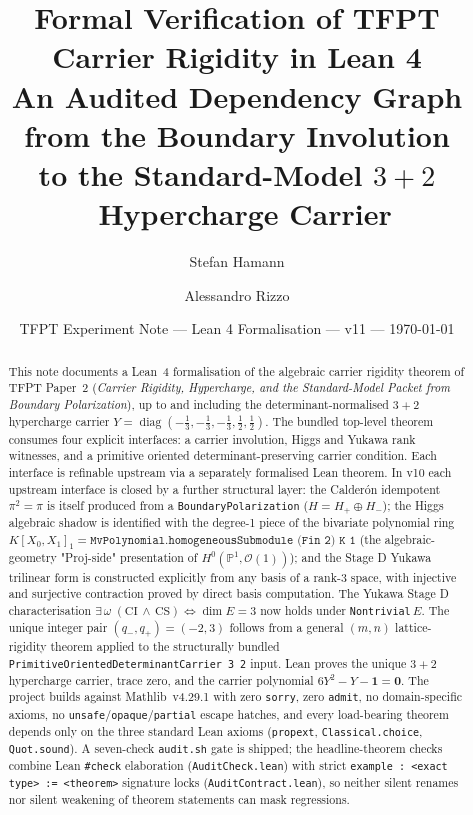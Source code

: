 \documentclass[11pt,a4paper]{article}
\title{\color{tfptblue}\textbf{Formal Verification of TFPT Carrier Rigidity in Lean 4}\\[0.4em]
{\Large An Audited Dependency Graph from the Boundary Involution\\
to the Standard-Model \boldmath$3+2$\unboldmath\ Hypercharge Carrier}}
\author{Stefan Hamann \and Alessandro Rizzo}
\date{{\normalsize\color{tfptgray}\sffamily TFPT Experiment Note --- Lean 4 Formalisation --- v11 --- \today}}
\begin{document}
\maketitle

\begin{abstract}
This note documents a Lean~4 formalisation of the algebraic
carrier rigidity theorem of TFPT Paper~2 (\emph{Carrier Rigidity,
Hypercharge, and the Standard-Model Packet from Boundary
Polarization}), up to and including the determinant-normalised
$3+2$ hypercharge carrier
$Y = \operatorname{diag}(-\tfrac13,-\tfrac13,-\tfrac13,\tfrac12,\tfrac12)$.
The bundled top-level theorem consumes four explicit interfaces:
a carrier involution, Higgs and Yukawa rank witnesses, and a
primitive oriented determinant-preserving carrier condition.
Each interface is refinable upstream via a separately formalised
Lean theorem. In v10 each upstream interface is closed by a
further structural layer: the Calder\'on idempotent
$\pi^2 = \pi$ is itself produced from a
\texttt{BoundaryPolarization} ($H = H_+ \oplus H_-$); the Higgs
algebraic shadow is identified with the degree-1 piece of the
bivariate polynomial ring
$K[X_0, X_1]_1 = \texttt{MvPolynomial.homogeneousSubmodule (Fin 2) K 1}$
(the algebraic-geometry "Proj-side" presentation of
$H^0(\mathbb P^1, \mathcal O(1))$); and the Stage D Yukawa
trilinear form is constructed explicitly from any basis of a
rank-$3$ space, with injective and surjective contraction proved
by direct basis computation. The Yukawa Stage D characterisation
$\exists\,\omega\;(\textrm{CI}\,\wedge\,\textrm{CS})
  \iff \dim E = 3$ now holds under \texttt{Nontrivial}\,$E$. The unique integer
pair $(q_-,q_+)=(-2,3)$ follows from a general $(m,n)$
lattice-rigidity theorem applied to the structurally bundled
\texttt{PrimitiveOrientedDeterminantCarrier 3 2} input. Lean
proves the unique $3+2$ hypercharge carrier, trace zero, and the
carrier polynomial $6 Y^2 - Y - \mathbf 1 = \mathbf 0$. The
project builds against Mathlib~v4.29.1 with zero \texttt{sorry},
zero \texttt{admit}, no domain-specific axioms, no
\texttt{unsafe}/\texttt{opaque}/\texttt{partial} escape hatches,
and every load-bearing theorem depends only on the three standard
Lean axioms (\texttt{propext}, \texttt{Classical.choice},
\texttt{Quot.sound}). A seven-check \texttt{audit.sh} gate is
shipped; the headline-theorem checks combine Lean
\texttt{\#check} elaboration (\texttt{AuditCheck.lean}) with
strict \texttt{example : <exact type> := <theorem>} signature
locks (\texttt{AuditContract.lean}), so neither silent renames
nor silent weakening of theorem statements can mask regressions.
\end{abstract}
\end{document}
